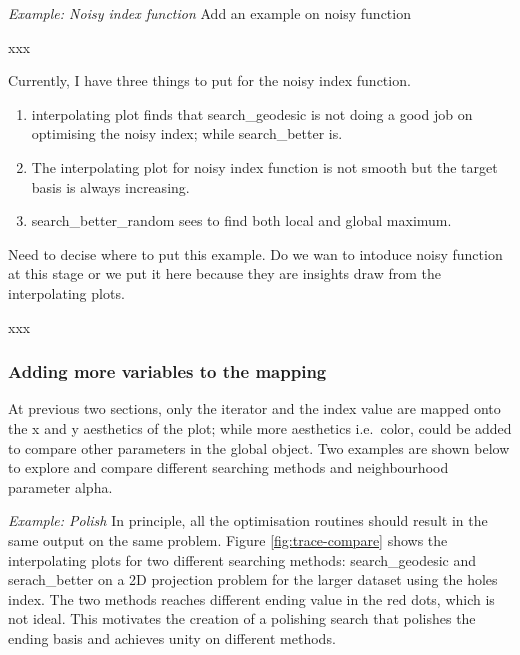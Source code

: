 \documentclass[12pt]{article}
\begin{document}
\emph{Example: Noisy index function} Add an example on noisy function

xxx

Currently, I have three things to put for the noisy index function.

\begin{enumerate}
\def\labelenumi{\arabic{enumi})}
\item
  interpolating plot finds that search\_geodesic is not doing a good job
  on optimising the noisy index; while search\_better is.
\item
  The interpolating plot for noisy index function is not smooth but the
  target basis is always increasing.
\item
  search\_better\_random sees to find both local and global maximum.
\end{enumerate}

Need to decise where to put this example. Do we wan to intoduce noisy
function at this stage or we put it here because they are insights draw
from the interpolating plots.

xxx

\hypertarget{adding-more-variables-to-the-mapping}{%
\subsubsection{Adding more variables to the
mapping}\label{adding-more-variables-to-the-mapping}}

At previous two sections, only the iterator and the index value are
mapped onto the x and y aesthetics of the plot; while more aesthetics
i.e.~color, could be added to compare other parameters in the global
object. Two examples are shown below to explore and compare different
searching methods and neighbourhood parameter alpha.

\emph{Example: Polish} In principle, all the optimisation routines
should result in the same output on the same problem. Figure
\ref{fig:trace-compare} shows the interpolating plots for two different
searching methods: search\_geodesic and serach\_better on a 2D
projection problem for the larger dataset using the holes index. The two
methods reaches different ending value in the red dots, which is not
ideal. This motivates the creation of a polishing search that polishes
the ending basis and achieves unity on different methods.
\end{document}
